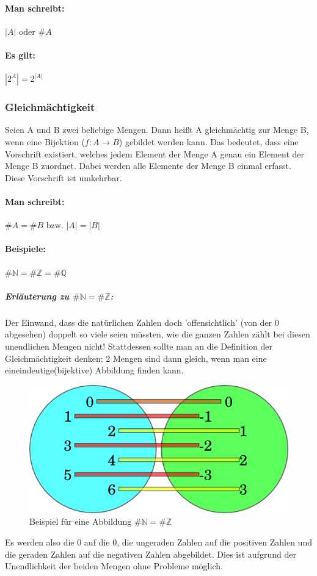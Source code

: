 \documentclass[a4paper,12pt, DIV12]{scrartcl}
\begin{document}
\paragraph{Man schreibt:}
\({}|{}A{}|{}\) oder \(\#A\)
\paragraph{Es gilt:}
\begin{math}
{}|{}2^A{}|{} = 2^{{}|{}A{}|{}}
\end{math}
\subsubsection*{Gleichmächtigkeit}
Seien A und B zwei beliebige Mengen.
Dann heißt A gleichmächtig zur Menge B, wenn eine Bijektion (\({f:A}\rightarrow{B}\)) gebildet
werden kann. Das bedeutet, dass eine Vorschrift existiert, welches
jedem Element der Menge A genau ein Element der Menge B zuordnet.
Dabei werden alle Elemente der Menge B einmal erfasst. Diese
Vorschrift ist umkehrbar.
\paragraph{Man schreibt:} \(\#A = \#B\) bzw. \(|A| = |B|\)
\paragraph*{Beispiele:}
\begin{math}
\#{\mathbb N} = \#{\mathbb Z} = \#{\mathbb Q}
\end{math}
\subparagraph{Erläuterung zu \(\#{\mathbb N} = \#{\mathbb Z}\):}
Der Einwand, dass die natürlichen Zahlen doch 'offensichtlich' (von der 0 abgesehen) doppelt so viele seien müssten, wie die ganzen Zahlen zählt bei diesen unendlichen Mengen nicht!
Stattdessen sollte man an die Definition der Gleichmächtigkeit denken: 2 Mengen sind dann gleich, wenn man eine eineindeutige(bijektive) Abbildung finden kann.
\begin{figure}[b]
  \centering
  \caption{Beispiel für eine Abbildung \(\#{\mathbb N} = \#{\mathbb Z}\)}
  \includegraphics[scale=0.5]{images/ngleichz.png}
\end{figure}
Es werden also die 0 auf die 0, die ungeraden Zahlen auf die positiven Zahlen und die geraden Zahlen auf die negativen Zahlen abgebildet. Dies ist aufgrund der Unendlichkeit der beiden Mengen ohne Probleme möglich.
\end{document}
